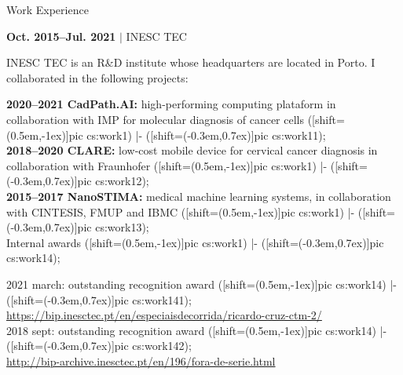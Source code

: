 \documentclass[11pt]{article}
\begin{document}
\begin{minipage}[t]{0.55\textwidth}
\setlength{\parskip}{1em}
\centerline{\sc\large Work Experience}

\begin{samepage}\textbf{Oct. 2015--Jul. 2021} $\vert$ INESC TEC
\\\begin{adjustwidth}{1.5em}{}%
\footnotesize
INESC TEC is an R\&D institute whose headquarters are located in Porto. I collaborated in the following projects:\par{}\textbf{2020--2021 CadPath.AI:} high-performing computing plataform in collaboration with IMP for molecular diagnosis of cancer cells
  ([shift={(0.5em,-1ex)}]pic cs:work1) |- ([shift={(-0.3em,0.7ex)}]pic cs:work11);\\\textbf{2018--2020 CLARE:} low-cost mobile device for cervical cancer diagnosis in collaboration with Fraunhofer
  ([shift={(0.5em,-1ex)}]pic cs:work1) |- ([shift={(-0.3em,0.7ex)}]pic cs:work12);\\\textbf{2015--2017 NanoSTIMA:} medical machine learning systems, in collaboration with CINTESIS, FMUP and IBMC
  ([shift={(0.5em,-1ex)}]pic cs:work1) |- ([shift={(-0.3em,0.7ex)}]pic cs:work13);\\Internal awards
  ([shift={(0.5em,-1ex)}]pic cs:work1) |- ([shift={(-0.3em,0.7ex)}]pic cs:work14);\begin{adjustwidth}{1.5em}{}%
\footnotesize
\vspace{-2ex}2021 march: outstanding recognition award
  ([shift={(0.5em,-1ex)}]pic cs:work14) |- ([shift={(-0.3em,0.7ex)}]pic cs:work141);\\{\footnotesize \url{https://bip.inesctec.pt/en/especiaisdecorrida/ricardo-cruz-ctm-2/}}\\2018 sept: outstanding recognition award
  ([shift={(0.5em,-1ex)}]pic cs:work14) |- ([shift={(-0.3em,0.7ex)}]pic cs:work142);\\{\footnotesize \url{http://bip-archive.inesctec.pt/en/196/fora-de-serie.html}}\\
\end{adjustwidth}


\end{adjustwidth}
\end{samepage}
\end{minipage}
\end{document}

